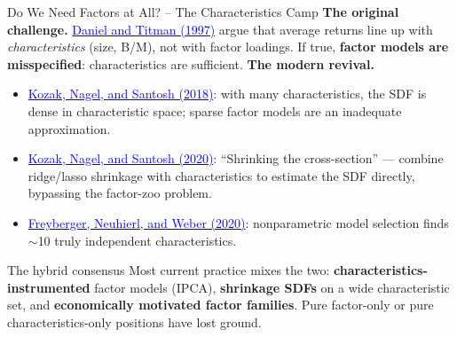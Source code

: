 \documentclass{beamer}
\begin{document}
\begin{frame}{Do We Need Factors at All? -- The Characteristics Camp}
	\textbf{The original challenge.} \href{https://doi.org/10.1111/j.1540-6261.1997.tb02724.x}{\textcolor{blue}{Daniel and Titman (1997)}} argue that average returns line up with \textit{characteristics} (size, B/M), not with factor loadings. If true, \textbf{factor models are misspecified}: characteristics are sufficient.
	\vspace{6pt}
	\textbf{The modern revival.}
	\begin{itemize}
		\item \href{https://doi.org/10.1111/jofi.12876}{\textcolor{blue}{Kozak, Nagel, and Santosh (2018)}}: with many characteristics, the SDF is dense in characteristic space; sparse factor models are an inadequate approximation.
		\item \href{https://doi.org/10.1016/j.jfineco.2019.06.008}{\textcolor{blue}{Kozak, Nagel, and Santosh (2020)}}: ``Shrinking the cross-section'' --- combine ridge/lasso shrinkage with characteristics to estimate the SDF directly, bypassing the factor-zoo problem.
		\item \href{https://doi.org/10.1093/rfs/hhz123}{\textcolor{blue}{Freyberger, Neuhierl, and Weber (2020)}}: nonparametric model selection finds $\sim$10 truly independent characteristics.
	\end{itemize}
	\vspace{4pt}
	\begin{block}{The hybrid consensus}
		Most current practice mixes the two: \textbf{characteristics-instrumented} factor models (IPCA), \textbf{shrinkage SDFs} on a wide characteristic set, and \textbf{economically motivated factor families}. Pure factor-only or pure characteristics-only positions have lost ground.
	\end{block}
\end{frame}
\end{document}
